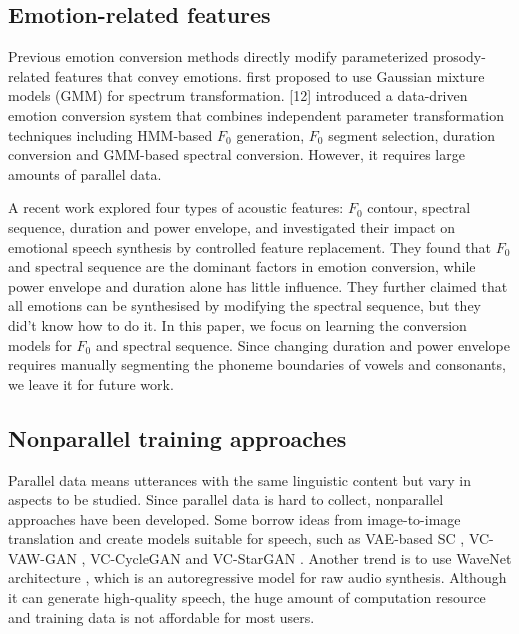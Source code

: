 \documentclass{article}
\begin{document}
\subsection{Emotion-related features}
Previous emotion conversion methods directly modify parameterized prosody-related features that convey emotions. \cite{kawanami2003gmm} first proposed to use Gaussian mixture models (GMM) for spectrum transformation. [12] introduced a data-driven emotion conversion system that combines independent parameter transformation techniques including HMM-based $F_0$ generation, $F_0$ segment selection, duration conversion and GMM-based spectral conversion. However, it requires large amounts of parallel data.

A recent work \cite{xue2018voice} explored four types of acoustic features: $F_0$ contour, spectral sequence, duration and power envelope, and investigated their impact on emotional speech synthesis by controlled feature replacement. They found that $F_0$ and spectral sequence are the dominant factors in emotion conversion, while power envelope and duration alone has little influence. They further claimed that all emotions can be synthesised by modifying the spectral sequence, but they did't know how to do it. In this paper, we focus on learning the conversion models for $F_0$ and spectral sequence. Since changing duration and power envelope requires manually segmenting the phoneme boundaries of vowels and consonants, we leave it for future work.

\subsection{Nonparallel training approaches}
Parallel data means utterances with the same linguistic content but vary in aspects to be studied. Since parallel data is hard to collect, nonparallel approaches have been developed. Some borrow ideas from image-to-image translation and create models suitable for speech, such as VAE-based SC \cite{hsu2016voice}, VC-VAW-GAN \cite{hsu2017voice}, VC-CycleGAN \cite{fang2018high,kaneko2017parallel} and VC-StarGAN \cite{kameoka2018stargan}. Another trend is to use WaveNet architecture \cite{van2016wavenet}, which is an autoregressive model for raw audio synthesis. Although it can generate high-quality speech, the huge amount of computation resource and training data is not affordable for most users.
\end{document}
